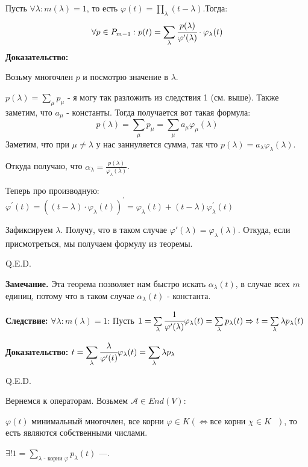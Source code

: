 
Пусть $\forall \lambda : m(\lambda) = 1$, то есть $\varphi(t) = \prod\limits_{\lambda}(t-\lambda)$.Тогда: $$ \forall p \in P_{m-1}: p(t) = \sum\limits_{\lambda}\cfrac{p(\lambda)}{\varphi'(\lambda)}\cdot \varphi_{\lambda}(t)$$
\textbf{Доказательство:}

Возьму многочлен $p$ и посмотрю значение в $\lambda$.

$p(\lambda) = \sum\limits_{\mu}p_{\mu}$ - я могу так разложить из следствия 1 (см. выше).  Также заметим, что $a_\mu$ - константы. Тогда получается вот такая формула:
$$p(\lambda) = \sum\limits_{\mu}p_{\mu}=\sum\limits_{\mu}a_\mu\varphi_{\mu}(\lambda)$$
Заметим, что при $\mu \neq \lambda$ у нас заннуляется сумма, так что $p(\lambda) = a_{\lambda }\varphi_{\lambda}(\lambda)$.

Откуда получаю, что $ \alpha_{\lambda}= \frac{p(\lambda)}{\varphi_{\lambda}(\lambda)}$.

Теперь про производную:  $\varphi^{\prime}(t)=((t- \lambda)\cdot \varphi_{\lambda}(t))^{\prime} = \varphi_{\lambda}(t) + (t- \lambda) \varphi^{\prime}_{\lambda}(t) $

Зафиксируем $\lambda$. Получу, что в таком случае $\varphi'(\lambda)=\varphi_{\lambda}(\lambda)$. Откуда, если присмотреться, мы получаем формулу из теоремы.

 \hfill Q.E.D.

\textbf{Замечание.} Эта теорема позволяет нам быстро искать $\alpha_\lambda(t)$, в случае всех $m$ единиц, потому что в таком случае $\alpha_\lambda(t)$ - константа.

\textbf{Следствие:} $\forall \lambda: m(\lambda)=1$: Пусть $1 = \sum\limits_{\lambda}\cfrac{1}{\varphi'(\lambda)} \varphi_\lambda(t) = \sum\limits_{\lambda}p_{\lambda}(t) \Rightarrow t = \sum\limits_{\lambda}\lambda p_{\lambda}(t)$

\textbf{Доказательство:}  $\displaystyle t = \sum\limits_{\lambda}\cfrac{\lambda}{\varphi'(t)}\varphi_{\lambda}(t) = \sum\limits_{\lambda}\lambda p_{\lambda}$

 \hfill Q.E.D.

 Вернемся к операторам. Возьмем $\mathcal{A} \in End(V)$:

$\varphi(t)$ минимальный многочлен, все корни $\varphi \in K (\Leftrightarrow \text{все корни $\chi \in K$ })$, то есть являются собственными числами.

$\exists! 1 = \sum\limits_{\lambda \text{ - корни } \varphi}p_{\lambda}(t)$ ---.


